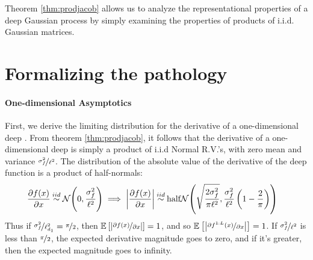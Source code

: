 \documentclass{article}
\begin{document}
Theorem \ref{thm:prodjacob} allows us to analyze the representational properties of a deep Gaussian process by simply examining the properties of products of i.i.d. Gaussian matrices.





\section{Formalizing the pathology}

\paragraph{One-dimensional Asymptotics}
First, we derive the limiting distribution for the derivative of a one-dimensional deep \gp{}.
From theorem \ref{thm:prodjacob}, it follows that the derivative of a one-dimensional deep \gp{} is simply a product of i.i.d Normal R.V.'s, with zero mean and variance $\nicefrac{\sigma^2_f}{\ell^2}$.  The distribution of the absolute value of the derivative of the deep function is a product of half-normals:
%
\begin{align}
\frac{\partial f(x)}{\partial x} \distas{iid} \Nt{0}{\frac{\sigma^2_f}{\ell^2}} \implies 
\left| \frac{\partial f(x)}{\partial x} \right| & \distas{iid} \textnormal{half}\Nt{\sqrt{\frac{2 \sigma^2_f}{\pi\ell^2}}}{\frac{\sigma^2_f}{\ell^2} \left( 1 - \frac{2}{\pi} \right)}
\end{align}
%
Thus if $\nicefrac{\sigma^2_f}{\ell_{d_1}^2} = \nicefrac{\pi}{2}$, then $\mathbb{E}_{} \left[ {\left| \nicefrac{\partial f(x)}{\partial x} \right|} \right] = 1$, and so $\mathbb{E}_{} \left[ {\left| \nicefrac{\partial f^{1:L}(x)}{\partial x} \right|} \right] = 1$.  If $\nicefrac{\sigma^2_f}{\ell^2}$ is less than $\nicefrac{\pi}{2}$, the expected derivative magnitude goes to zero, and if it's greater, then the expected magnitude goes to infinity.  
\end{document}
